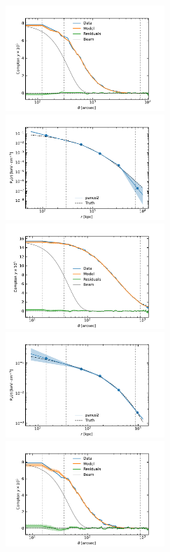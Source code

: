 \begin{figure}[t]
    \centering
    \includegraphics[height=4cm, trim={0 0 1cm 0.5cm}, clip]{../validation/results/C1/Planck/data_model_residuals_profiles.pdf}
    \includegraphics[height=4cm, trim={0 0 1cm 0.5cm}, clip]{../validation/results/C1/Planck/pressure_profile.pdf} \\
    \includegraphics[height=4cm, trim={0 0 1cm 0.5cm}, clip]{../validation/results/C1/SPT/data_model_residuals_profiles.pdf}
    \includegraphics[height=4cm, trim={0 0 1cm 0.5cm}, clip]{../validation/results/C1/SPT/pressure_profile.pdf} \\
    \includegraphics[height=4cm, trim={0 0 1cm 0.5cm}, clip]{../validation/results/C2/SPT/data_model_residuals_profiles.pdf}

\end{figure}
